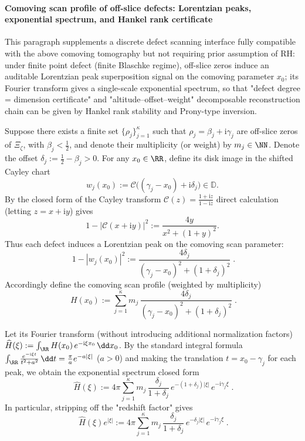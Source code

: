 \paragraph{Comoving scan profile of off-slice defects: Lorentzian peaks, exponential spectrum, and Hankel rank certificate}
This paragraph supplements a discrete defect scanning interface fully compatible with the above comoving tomography but not requiring prior assumption of RH: under finite point defect (finite Blaschke regime), off-slice zeros induce an auditable Lorentzian peak superposition signal on the comoving parameter \(x_0\); its Fourier transform gives a single-scale exponential spectrum, so that "defect degree = dimension certificate" and "altitude--offset--weight" decomposable reconstruction chain can be given by Hankel rank stability and Prony-type inversion.
\par
Suppose there exists a finite set \(\{\rho_j\}_{j=1}^{\kappa}\) such that \(\rho_j=\beta_j+\mathrm{i}\gamma_j\) are off-slice zeros of \(\Xi_{\zeta}\), with \(\beta_j<\tfrac12\), and denote their multiplicity (or weight) by \(m_j\in\NN\).
Denote the offset \(\delta_j:=\tfrac12-\beta_j>0\).
For any \(x_0\in\RR\), define its disk image in the shifted Cayley chart
\[
w_{j}(x_0):=\mathcal{C}\bigl((\gamma_j-x_0)+\mathrm{i}\delta_j\bigr)\in\mathbb{D}.
\]
By the closed form of the Cayley transform
\(
\mathcal{C}(z)=\frac{1+\mathrm{i}z}{1-\mathrm{i}z}
\)
direct calculation (letting \(z=x+\mathrm{i}y\)) gives
\[
1-\bigl|\mathcal{C}(x+\mathrm{i}y)\bigr|^2
:=\frac{4y}{x^2+(1+y)^2}.
\]
Thus each defect induces a Lorentzian peak on the comoving scan parameter:
\begin{equation}\label{eq:xi-comoving-scan-lorentz-peak}
\boxed{\;
1-|w_{j}(x_0)|^2
:=\frac{4\delta_j}{(\gamma_j-x_0)^2+(1+\delta_j)^2}\; }.
\end{equation}
Accordingly define the comoving scan profile (weighted by multiplicity)
\begin{equation}\label{eq:xi-comoving-scan-profile-H}
\boxed{\;
H(x_0):=\sum_{j=1}^{\kappa}m_j\,\frac{4\delta_j}{(\gamma_j-x_0)^2+(1+\delta_j)^2}\; }.
\end{equation}
\par
Let its Fourier transform (without introducing additional normalization factors)
\(
\widehat H(\xi):=\int_{\RR}H(x_0)\,e^{-\mathrm{i}\xi x_0}\,\dd x_0
\).
By the standard integral formula
\(
\int_{\RR}\frac{e^{-\mathrm{i}\xi t}}{t^2+a^2}\,\dd t=\frac{\pi}{a}e^{-a|\xi|}
\)
(\(a>0\)) and making the translation \(t=x_0-\gamma_j\) for each peak, we obtain the exponential spectrum closed form
\begin{equation}\label{eq:xi-comoving-scan-fourier}
\boxed{\;
\widehat H(\xi)
:=4\pi\sum_{j=1}^{\kappa}m_j\,\frac{\delta_j}{1+\delta_j}\,e^{-(1+\delta_j)|\xi|}\,e^{-\mathrm{i}\gamma_j\xi}\; }.
\end{equation}
In particular, stripping off the "redshift factor" gives
\begin{equation}\label{eq:xi-comoving-scan-exp-spectrum}
\boxed{\;
\widehat H(\xi)e^{|\xi|}
:=4\pi\sum_{j=1}^{\kappa}m_j\,\frac{\delta_j}{1+\delta_j}\,e^{-\delta_j|\xi|}\,e^{-\mathrm{i}\gamma_j\xi}\; }.
\end{equation}

